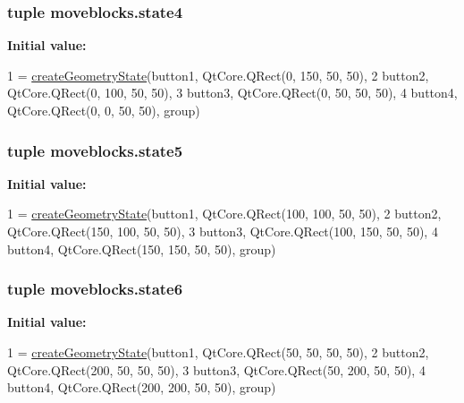 \subsubsection[{state4}]{\setlength{\rightskip}{0pt plus 5cm}tuple moveblocks.\+state4}\label{namespacemoveblocks_ad8534e18a69faf0a521009c595d5516d}
{\bfseries Initial value\+:}
\begin{DoxyCode}
1 = \hyperlink{namespacemoveblocks_a0ad74b53c498f8dd97b3a612778b8661}{createGeometryState}(button1, QtCore.QRect(0, 150, 50, 50),
2             button2, QtCore.QRect(0, 100, 50, 50),
3             button3, QtCore.QRect(0, 50, 50, 50),
4             button4, QtCore.QRect(0, 0, 50, 50), group)
\end{DoxyCode}
\hypertarget{namespacemoveblocks_ade25f31bc61a62830b681ca4c7c4ce97}{}
\subsubsection[{state5}]{\setlength{\rightskip}{0pt plus 5cm}tuple moveblocks.\+state5}\label{namespacemoveblocks_ade25f31bc61a62830b681ca4c7c4ce97}
{\bfseries Initial value\+:}
\begin{DoxyCode}
1 = \hyperlink{namespacemoveblocks_a0ad74b53c498f8dd97b3a612778b8661}{createGeometryState}(button1, QtCore.QRect(100, 100, 50, 50),
2             button2, QtCore.QRect(150, 100, 50, 50),
3             button3, QtCore.QRect(100, 150, 50, 50),
4             button4, QtCore.QRect(150, 150, 50, 50), group)
\end{DoxyCode}
\hypertarget{namespacemoveblocks_a05ccc281f3314a22819d534b5eb3ebac}{}
\subsubsection[{state6}]{\setlength{\rightskip}{0pt plus 5cm}tuple moveblocks.\+state6}\label{namespacemoveblocks_a05ccc281f3314a22819d534b5eb3ebac}
{\bfseries Initial value\+:}
\begin{DoxyCode}
1 = \hyperlink{namespacemoveblocks_a0ad74b53c498f8dd97b3a612778b8661}{createGeometryState}(button1, QtCore.QRect(50, 50, 50, 50),
2             button2, QtCore.QRect(200, 50, 50, 50),
3             button3, QtCore.QRect(50, 200, 50, 50),
4             button4, QtCore.QRect(200, 200, 50, 50), group)
\end{DoxyCode}
\hypertarget{namespacemoveblocks_a2c080f1b384feaceca2e074ffb544eef}{}
